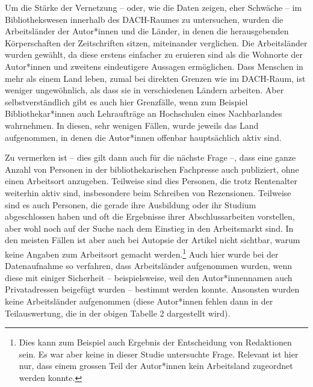 \documentclass[a4paper,
fontsize=11pt,
oneside,
numbers=noperiodatend,
parskip=half-,
bibliography=totoc,
final
]{scrartcl}
\begin{document}
Um die Stärke der Vernetzung -- oder, wie die Daten zeigen, eher
Schwäche -- im Bibliothekswesen innerhalb des DACH-Raumes zu
untersuchen, wurden die Arbeitsländer der Autor*innen und die Länder, in
denen die herausgebenden Körperschaften der Zeitschriften sitzen,
miteinander verglichen. Die Arbeitsländer wurden gewählt, da diese
erstens einfacher zu eruieren sind als die Wohnorte der Autor*innen und
zweitens eindeutigere Aussagen ermöglichen. Dass Menschen in mehr als
einem Land leben, zumal bei direkten Grenzen wie im DACH-Raum, ist
weniger ungewöhnlich, als dass sie in verschiedenen Ländern arbeiten.
Aber selbstverständlich gibt es auch hier Grenzfälle, wenn zum Beispiel
Bibliothekar*innen auch Lehraufträge an Hochschulen eines Nachbarlandes
wahrnehmen. In diesen, sehr wenigen Fällen, wurde jeweils das Land
aufgenommen, in denen die Autor*innen offenbar hauptsächlich aktiv sind.

Zu vermerken ist -- dies gilt dann auch für die nächste Frage --, dass
eine ganze Anzahl von Personen in der bibliothekarischen Fachpresse auch
publiziert, ohne einen Arbeitsort anzugeben. Teilweise sind dies
Personen, die trotz Rentenalter weiterhin aktiv sind, insbesondere beim
Schreiben von Rezensionen. Teilweise sind es auch Personen, die gerade
ihre Ausbildung oder ihr Studium abgeschlossen haben und oft die
Ergebnisse ihrer Abschlussarbeiten vorstellen, aber wohl noch auf der
Suche nach dem Einstieg in den Arbeitsmarkt sind. In den meisten Fällen
ist aber auch bei Autopsie der Artikel nicht sichtbar, warum keine
Angaben zum Arbeitsort gemacht werden.\footnote{Dies kann zum Beispiel
  auch Ergebnis der Entscheidung von Redaktionen sein. Es war aber keine
  in dieser Studie untersuchte Frage. Relevant ist hier nur, dass einem
  grossen Teil der Autor*innen kein Arbeitsland zugeordnet werden
  konnte.} Auch hier wurde bei der Datenaufnahme so verfahren, dass
Arbeitsländer aufgenommen wurden, wenn diese mit einiger Sicherheit --
beispielsweise, weil den Autor*innennamen auch Privatadressen beigefügt
wurden -- bestimmt werden konnte. Ansonsten wurden keine Arbeitsländer
aufgenommen (diese Autor*innen fehlen dann in der Teilauswertung, die in
der obigen Tabelle 2 dargestellt wird).
\end{document}
